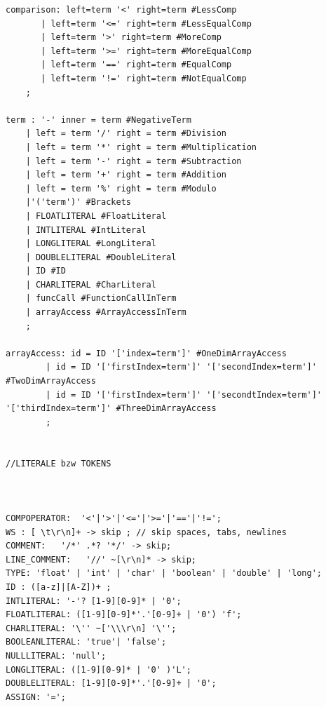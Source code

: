 \documentclass[parskip=full]{scrartcl}
\begin{document}
\begin{verbatim}
comparison: left=term '<' right=term #LessComp
	   | left=term '<=' right=term #LessEqualComp
	   | left=term '>' right=term #MoreComp
	   | left=term '>=' right=term #MoreEqualComp
	   | left=term '==' right=term #EqualComp
	   | left=term '!=' right=term #NotEqualComp
	;

term : '-' inner = term #NegativeTerm
    | left = term '/' right = term #Division
	| left = term '*' right = term #Multiplication
	| left = term '-' right = term #Subtraction
	| left = term '+' right = term #Addition
	| left = term '%' right = term #Modulo
	|'('term')' #Brackets
	| FLOATLITERAL #FloatLiteral
	| INTLITERAL #IntLiteral
	| LONGLITERAL #LongLiteral
	| DOUBLELITERAL #DoubleLiteral
	| ID #ID
	| CHARLITERAL #CharLiteral
	| funcCall #FunctionCallInTerm
	| arrayAccess #ArrayAccessInTerm
	;

arrayAccess: id = ID '['index=term']' #OneDimArrayAccess
		| id = ID '['firstIndex=term']' '['secondIndex=term']' #TwoDimArrayAccess
		| id = ID '['firstIndex=term']' '['secondtIndex=term']' '['thirdIndex=term']' #ThreeDimArrayAccess
		;


//LITERALE bzw TOKENS



COMPOPERATOR:  '<'|'>'|'<='|'>='|'=='|'!=';
WS : [ \t\r\n]+ -> skip ; // skip spaces, tabs, newlines
COMMENT:   '/*' .*? '*/' -> skip;
LINE_COMMENT:   '//' ~[\r\n]* -> skip;
TYPE: 'float' | 'int' | 'char' | 'boolean' | 'double' | 'long';
ID : ([a-z]|[A-Z])+ ;
INTLITERAL: '-'? [1-9][0-9]* | '0';
FLOATLITERAL: ([1-9][0-9]*'.'[0-9]+ | '0') 'f';
CHARLITERAL: '\'' ~['\\\r\n] '\'';
BOOLEANLITERAL:	'true'|	'false';
NULLLITERAL: 'null';
LONGLITERAL: ([1-9][0-9]* | '0' )'L';
DOUBLELITERAL: [1-9][0-9]*'.'[0-9]+ | '0';
ASSIGN: '=';
\end{verbatim}
\end{document}
